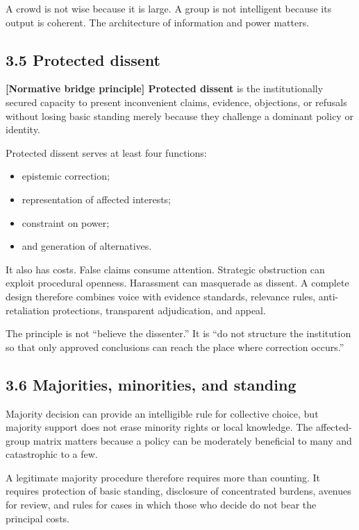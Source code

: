 \documentclass[
  11pt,
]{article}
\providecommand{\tightlist}{%
  \setlength{\itemsep}{0pt}\setlength{\parskip}{0pt}}
\begin{document}
A crowd is not wise because it is large. A group is not intelligent
because its output is coherent. The architecture of information and
power matters.

\subsection{3.5 Protected dissent}\label{protected-dissent}

\textbf{{[}Normative bridge principle{]} Protected dissent} is the
institutionally secured capacity to present inconvenient claims,
evidence, objections, or refusals without losing basic standing merely
because they challenge a dominant policy or identity.

Protected dissent serves at least four functions:

\begin{itemize}
\tightlist
\item
  epistemic correction;
\item
  representation of affected interests;
\item
  constraint on power;
\item
  and generation of alternatives.
\end{itemize}

It also has costs. False claims consume attention. Strategic obstruction
can exploit procedural openness. Harassment can masquerade as dissent. A
complete design therefore combines voice with evidence standards,
relevance rules, anti-retaliation protections, transparent adjudication,
and appeal.

The principle is not ``believe the dissenter.'' It is ``do not structure
the institution so that only approved conclusions can reach the place
where correction occurs.''

\subsection{3.6 Majorities, minorities, and
standing}\label{majorities-minorities-and-standing}

Majority decision can provide an intelligible rule for collective
choice, but majority support does not erase minority rights or local
knowledge. The affected-group matrix matters because a policy can be
moderately beneficial to many and catastrophic to a few.

A legitimate majority procedure therefore requires more than counting.
It requires protection of basic standing, disclosure of concentrated
burdens, avenues for review, and rules for cases in which those who
decide do not bear the principal costs.
\end{document}
